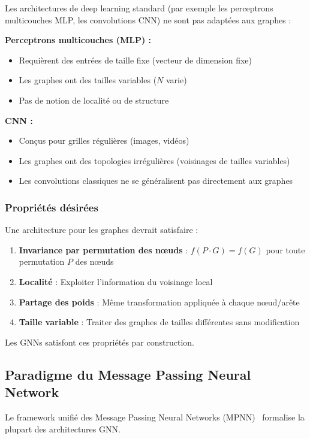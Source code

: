 Les architectures de deep learning standard (par exemple les perceptrons multicouches MLP, les convolutions CNN) ne sont pas adaptées aux graphes :

\textbf{Perceptrons multicouches (MLP) :}
\begin{itemize}
    \item Requièrent des entrées de taille fixe (vecteur de dimension fixe)
    \item Les graphes ont des tailles variables ($N$ varie)
    \item Pas de notion de localité ou de structure
\end{itemize}

\textbf{CNN :}
\begin{itemize}
    \item Conçus pour grilles régulières (images, vidéos)
    \item Les graphes ont des topologies irrégulières (voisinages de tailles variables)
    \item Les convolutions classiques ne se généralisent pas directement aux graphes
\end{itemize}

\subsubsection{Propriétés désirées}

Une architecture pour les graphes devrait satisfaire :
\begin{enumerate}
    \item \textbf{Invariance par permutation des nœuds} : $f(P \cdot G) = f(G)$ pour toute permutation $P$ des nœuds
    \item \textbf{Localité} : Exploiter l'information du voisinage local
    \item \textbf{Partage des poids} : Même transformation appliquée à chaque nœud/arête
    \item \textbf{Taille variable} : Traiter des graphes de tailles différentes sans modification
\end{enumerate}
Les GNNs satisfont ces propriétés par construction.

\subsection{Paradigme du Message Passing Neural Network}

Le framework unifié des Message Passing Neural Networks (MPNN)~\cite{Gilmer2017} formalise la plupart des architectures GNN.

